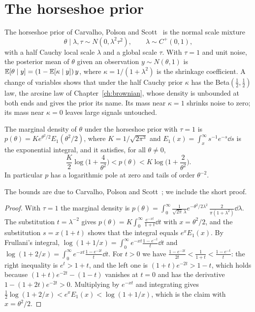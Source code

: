 \section{The horseshoe prior}

The horseshoe prior of Carvalho, Polson and Scott~\cite{carvalho2010} is the normal scale mixture
\[
\theta\mid\lambda,\tau\sim N(0,\lambda^2\tau^2),\qquad\lambda\sim C^+(0,1),
\]
with a half Cauchy local scale $\lambda$ and a global scale $\tau$. With $\tau = 1$ and unit noise, the posterior mean of $\theta$ given an observation $y\sim N(\theta,1)$ is $\mathbb{E}[\theta\mid y] = (1-\mathbb{E}[\kappa\mid y])\,y$, where $\kappa = 1/(1+\lambda^2)$ is the shrinkage coefficient. A change of variables shows that under the half Cauchy prior $\kappa$ has the Beta$(\frac12,\frac12)$ law, the arcsine law of Chapter~\ref{ch:brownian}, whose density is unbounded at both ends and gives the prior its name. Its mass near $\kappa = 1$ shrinks noise to zero; its mass near $\kappa = 0$ leaves large signals untouched.

\begin{theorem}\label{thm:horseshoe_bounds}%
The marginal density of $\theta$ under the horseshoe prior with $\tau = 1$ is $p(\theta) = Ke^{\theta^2/2}E_1(\theta^2/2)$, where $K = 1/\sqrt{2\pi^3}$ and $E_1(x) = \int_x^\infty s^{-1}e^{-s}\dd s$ is the exponential integral, and it satisfies, for all $\theta\neq0$,
\[
\frac K2\log\Big(1+\frac4{\theta^2}\Big)<p(\theta)<K\log\Big(1+\frac2{\theta^2}\Big).
\]
In particular $p$ has a logarithmic pole at zero and tails of order $\theta^{-2}$.
\end{theorem}

The bounds are due to Carvalho, Polson and Scott~\cite{carvalho2010}; we include the short proof.

\begin{proof}
With $\tau=1$ the marginal density is $p(\theta) = \int_0^\infty\frac{1}{\sqrt{2\pi}\,\lambda}e^{-\theta^2/2\lambda^2}\,\frac{2}{\pi(1+\lambda^2)}\dd\lambda$. The substitution $t = \lambda^{-2}$ gives $p(\theta) = K\int_0^\infty\frac{e^{-xt}}{1+t}\dd t$ with $x = \theta^2/2$, and the substitution $s = x(1+t)$ shows that the integral equals $e^xE_1(x)$. By Frullani's integral, $\log(1+1/x) = \int_0^\infty e^{-xt}\frac{1-e^{-t}}{t}\dd t$ and $\log(1+2/x) = \int_0^\infty e^{-xt}\frac{1-e^{-2t}}{t}\dd t$. For $t>0$ we have $\frac{1-e^{-2t}}{2t}<\frac{1}{1+t}<\frac{1-e^{-t}}{t}$: the right inequality is $e^t>1+t$, and the left one is $(1+t)e^{-2t}>1-t$, which holds because $(1+t)e^{-2t}-(1-t)$ vanishes at $t=0$ and has the derivative $1-(1+2t)e^{-2t}>0$. Multiplying by $e^{-xt}$ and integrating gives $\frac12\log(1+2/x)<e^xE_1(x)<\log(1+1/x)$, which is the claim with $x = \theta^2/2$.
\end{proof}

